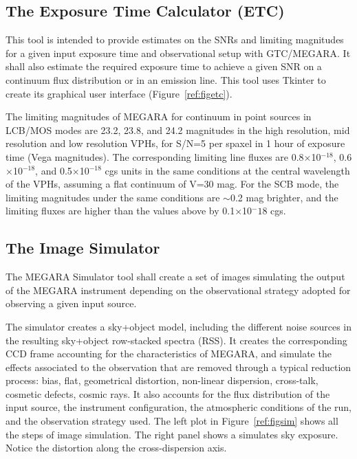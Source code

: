 \subsection{The Exposure Time Calculator (ETC)}

This tool is intended to provide estimates on the SNRs and limiting magnitudes for a given
input exposure time and observational setup with GTC/MEGARA. It shall also estimate the required exposure time to achieve a given SNR on a continuum flux distribution or in an emission line. This tool uses Tkinter to create its graphical user interface (Figure~\ref{ref:figetc}).


The limiting magnitudes of MEGARA for continuum in point sources in LCB/MOS modes are 23.2, 23.8, and 24.2 magnitudes in the high resolution, mid resolution and low resolution VPHs, for S/N=5 per spaxel in 1 hour of exposure time (Vega magnitudes). The corresponding limiting line fluxes are 
0.8$\times$10$^{-18}$, 0.6$\times$10$^{-18}$, and 0.5$\times$10$^{-18}$ cgs units in the same conditions at the central wavelength of the VPHs, assuming a flat continuum of V=30 mag. For the SCB mode, the limiting magnitudes under the same conditions are $\sim$0.2 mag brighter, and the limiting fluxes are higher than the values above by 0.1$\times$10$^-18$ cgs.

\subsection{The Image Simulator}

The MEGARA Simulator tool shall create a set of images simulating the output of the
MEGARA instrument depending on the observational strategy adopted for observing a given input source. 

The simulator creates a sky+object model, including the different noise sources in the resulting sky+object row-stacked spectra (RSS). It creates the corresponding CCD frame accounting for the characteristics of MEGARA, and simulate the effects associated to the observation that are removed through a typical reduction process: bias, flat, geometrical distortion, non-linear  dispersion, cross-talk, cosmetic defects, cosmic rays. It also accounts for the flux distribution of the input source, the instrument configuration, the atmospheric conditions of the run, and the observation strategy used. 
The left plot in Figure~\ref{ref:figsim} shows all the steps of image simulation. The right panel shows a simulates sky exposure. Notice the
distortion along the cross-dispersion axis.

